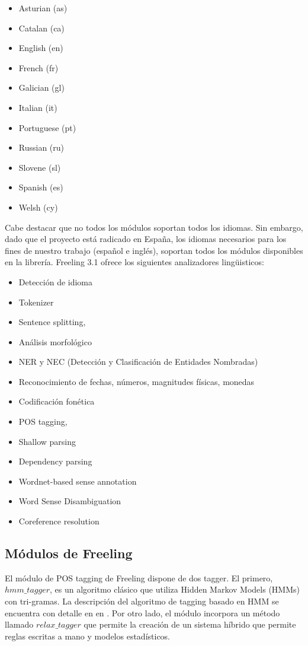 \begin{itemize}
\item Asturian (as)
\item Catalan (ca) 
\item English (en)
\item French (fr) 
\item Galician (gl)
\item Italian (it)
\item Portuguese (pt)
\item Russian (ru)
\item Slovene (sl)
\item Spanish (es)
\item Welsh (cy)
\end{itemize}

Cabe destacar que no todos los m\'odulos soportan todos los idiomas. Sin embargo, dado que el proyecto está radicado en Espa\~na,
los idiomas necesarios para los fines de nuestro trabajo (espa\~nol e inglés), soportan todos los m\'odulos disponibles
en la librería.
Freeling 3.1 ofrece los siguientes analizadores lingüisticos:

\begin{itemize}
\item Detecci\'on de idioma
\item Tokenizer
\item Sentence splitting,
\item Análisis morfol\'ogico
\item NER y NEC (Detecci\'on y Clasificaci\'on de Entidades Nombradas)
\item Reconocimiento de fechas, números, magnitudes físicas, monedas
\item Codificaci\'on fonética
\item POS tagging, 
\item Shallow parsing
\item Dependency parsing
\item Wordnet-based sense annotation
\item Word Sense Disambiguation
\item Coreference resolution
\end{itemize}


\subsection{Módulos de Freeling}
\label{subsec:freeling-pos}
El módulo de POS tagging de Freeling dispone de dos tagger. El primero, $hmm\_tagger$, es un algoritmo clásico que utiliza Hidden Markov Models (HMMs) con tri-gramas. La descripción del algoritmo de tagging basado en HMM se encuentra con detalle en  en \cite{POS0}. Por otro lado, el módulo incorpora un método llamado $relax\_tagger$ que permite la creación de un sistema híbrido que permite reglas escritas a mano y modelos estadísticos. 


